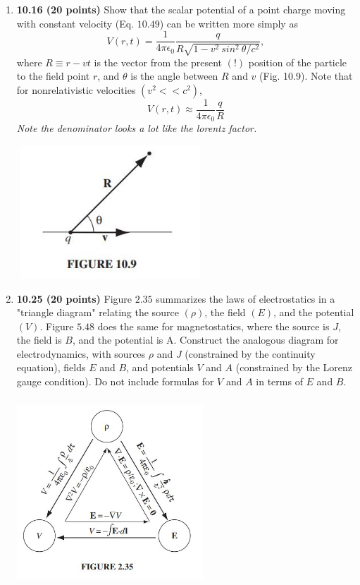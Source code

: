 \documentclass[fleqn]{article}
\begin{document}
\begin{enumerate}
    \item \textbf{10.16 (20 points)} Show that the scalar potential of a point charge moving with constant 
    velocity (Eq. $10.49$) can be written more simply as
    $$
      V(r,t)=\dfrac{1}{4 \pi \epsilon_0} \dfrac{q}{R\sqrt{1-v^2 ~ sin^2 ~ \theta/c^2}},
    $$
    where $R \equiv r-vt$ is the vector from the present $(!)$ position of the particle to the
    field point $r$, and $\theta$ is the angle between $R$ and $v$ (Fig. 10.9). Note that 
    for nonrelativistic velocities $(v^2 << c^2)$,
    $$
      V(r,t) \approx \dfrac{1}{4 \pi \epsilon_0} \dfrac{q}{R}
    $$
    \emph{Note the denominator looks a lot like the lorentz factor.}
    \begin{center}
      \includegraphics[height=5cm, width=7cm]{1.JPG}
    \end{center}


    \item \textbf{10.25 (20 points)} Figure $2.35$ summarizes the laws of electrostatics in a "triangle
    diagram" relating the source $(\rho)$, the field $(E)$, and the potential $(V)$. Figure $5.48$
    does the same for magnetostatics, where the source is $J$, the field is $B$, and the
    potential is A. Construct the analogous diagram for electrodynamics, with sources
    $\rho$ and $J$ (constrained by the continuity equation), fields $E$ and $B$, and potentials $V$
    and $A$ (constrained by the Lorenz gauge condition). Do not include formulas for $V$
    and $A$ in terms of $E$ and $B$.
    \begin{center}
      \includegraphics[height=7cm, width=7cm]{2.JPG}
    \end{center}

    
  \end{enumerate}
\end{document}
